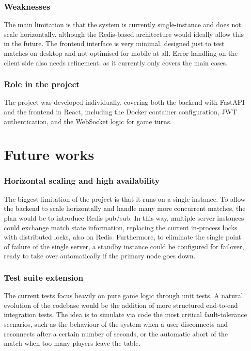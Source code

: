 \documentclass{scrartcl}
\begin{document}
\subsubsection*{Weaknesses}

The main limitation is that the system is currently single-instance
and does not scale horizontally, although the Redis-based architecture
would ideally allow this in the future.
The frontend interface is very minimal, designed just to test matches
on desktop and not optimised for mobile at all.
Error handling on the client side also needs refinement,
as it currently only covers the main cases.

\subsubsection*{Role in the project}

The project was developed individually, covering both the backend with FastAPI
and the frontend in React, including the Docker container configuration,
JWT authentication, and the WebSocket logic for game turns.


\section{Future works}\label{future-works}

\subsubsection*{Horizontal scaling and high availability}

The biggest limitation of the project is that it runs on a single instance.
To allow the backend to scale horizontally and handle many more concurrent matches,
the plan would be to introduce Redis pub/sub.
In this way, multiple server instances could exchange match state information,
replacing the current in-process locks with distributed locks, also on Redis.
Furthermore, to eliminate the single point of failure of the single server,
a standby instance could be configured for failover,
ready to take over automatically if the primary node goes down.

\subsubsection*{Test suite extension}

The current tests focus heavily on pure game logic through unit tests.
A natural evolution of the codebase would be the addition of more structured
end-to-end integration tests.
The idea is to simulate via code the most critical fault-tolerance scenarios,
such as the behaviour of the system when a user disconnects and reconnects
after a certain number of seconds, or the automatic abort of the match
when too many players leave the table.
\end{document}
